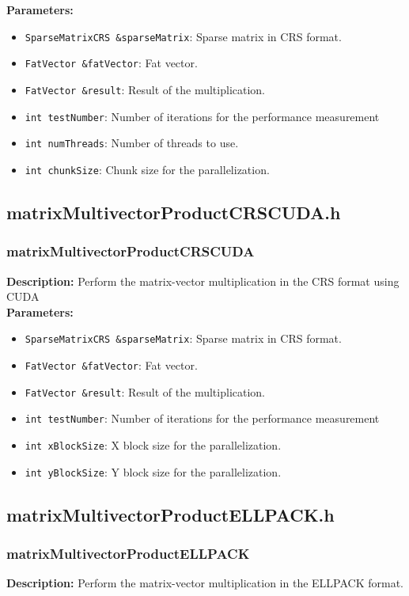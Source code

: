 \documentclass[12pt,oneside]{book} %
\begin{document}
\begin{subappendices}
    \textbf{Parameters:}
    \begin{itemize}
        \item \texttt{SparseMatrixCRS \&sparseMatrix}: Sparse matrix in CRS format.
        \item \texttt{FatVector \&fatVector}: Fat vector.
        \item \texttt{FatVector \&result}: Result of the multiplication.
        \item \texttt{int testNumber}: Number of iterations for the performance measurement
        \item \texttt{int numThreads}: Number of threads to use.
        \item \texttt{int chunkSize}: Chunk size for the parallelization.
    \end{itemize}

    \subsection{matrixMultivectorProductCRSCUDA.h}
    \subsubsection{matrixMultivectorProductCRSCUDA}
    \textbf{Description:} Perform the matrix-vector multiplication in the CRS format using CUDA\\

    \textbf{Parameters:}
    \begin{itemize}
        \item \texttt{SparseMatrixCRS \&sparseMatrix}: Sparse matrix in CRS format.
        \item \texttt{FatVector \&fatVector}: Fat vector.
        \item \texttt{FatVector \&result}: Result of the multiplication.
        \item \texttt{int testNumber}: Number of iterations for the performance measurement
        \item \texttt{int xBlockSize}: X block size for the parallelization.
        \item \texttt{int yBlockSize}: Y block size for the parallelization.
    \end{itemize}

    \subsection{matrixMultivectorProductELLPACK.h}
    \subsubsection{matrixMultivectorProductELLPACK}
    \textbf{Description:} Perform the matrix-vector multiplication in the ELLPACK format.\\


\end{subappendices}
\end{document}
